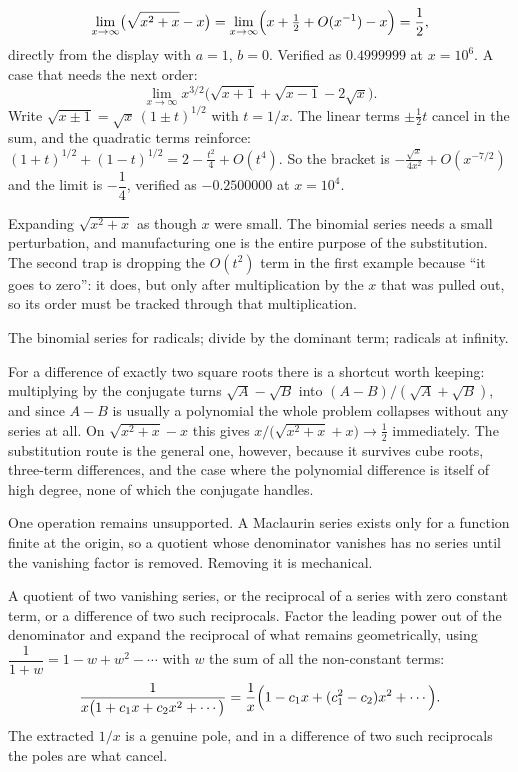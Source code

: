 \begin{worked}
\[
\lim_{x\to\infty}\bigl(\sqrt{x^{2}+x}-x\bigr)=\lim_{x\to\infty}\Bigl(x+\tfrac12+O(x^{-1})-x\Bigr)=\frac12 ,
\]
directly from the display with $a=1$, $b=0$. Verified as $0.4999999$ at $x=10^{6}$. A case that needs the next order:
\[
\lim_{x\to\infty}x^{3/2}\bigl(\sqrt{x+1}+\sqrt{x-1}-2\sqrt{x}\bigr).
\]
Write $\sqrt{x\pm1}=\sqrt x\,(1\pm t)^{1/2}$ with $t=1/x$. The linear terms $\pm\tfrac12t$ cancel in the sum, and the quadratic terms reinforce: $(1+t)^{1/2}+(1-t)^{1/2}=2-\tfrac{t^{2}}{4}+O(t^{4})$. So the bracket is $-\tfrac{\sqrt x}{4x^{2}}+O(x^{-7/2})$ and the limit is $-\dfrac14$, verified as $-0.2500000$ at $x=10^{4}$.
\end{worked}

\begin{trap}
Expanding $\sqrt{x^{2}+x}$ as though $x$ were small. The binomial series needs a small perturbation, and manufacturing one is the entire purpose of the substitution. The second trap is dropping the $O(t^{2})$ term in the first example because ``it goes to zero'': it does, but only after multiplication by the $x$ that was pulled out, so its order must be tracked through that multiplication.
\end{trap}

\begin{seealsob}The binomial series for radicals; divide by the dominant term; radicals at infinity.\end{seealsob}

For a difference of exactly two square roots there is a shortcut worth keeping: multiplying by the conjugate turns $\sqrt A-\sqrt B$ into $(A-B)/(\sqrt A+\sqrt B)$, and since $A-B$ is usually a polynomial the whole problem collapses without any series at all. On $\sqrt{x^{2}+x}-x$ this gives $x\big/\bigl(\sqrt{x^{2}+x}+x\bigr)\to\tfrac12$ immediately. The substitution route is the general one, however, because it survives cube roots, three-term differences, and the case where the polynomial difference is itself of high degree, none of which the conjugate handles.

One operation remains unsupported. A Maclaurin series exists only for a function finite at the origin, so a quotient whose denominator vanishes has no series until the vanishing factor is removed. Removing it is mechanical.

\cue A quotient of two vanishing series, or the reciprocal of a series with zero constant term, or a difference of two such reciprocals.
\method Factor the leading power out of the denominator and expand the reciprocal of what remains geometrically, using $\dfrac{1}{1+w}=1-w+w^{2}-\cdots$ with $w$ the sum of all the non-constant terms:
\[
\frac{1}{x\bigl(1+c_1x+c_2x^{2}+\cdots\bigr)}=\frac1x\Bigl(1-c_1x+(c_1^{2}-c_2)x^{2}+\cdots\Bigr).
\]
The extracted $1/x$ is a genuine pole, and in a difference of two such reciprocals the poles are what cancel.


